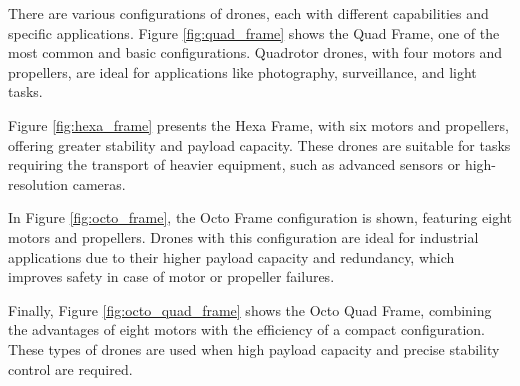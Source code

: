     There are various configurations of drones, each with different capabilities and specific applications. Figure \ref{fig:quad_frame} shows the Quad Frame, one of the most common and basic configurations. Quadrotor drones, with four motors and propellers, are ideal for applications like photography, surveillance, and light tasks.

    Figure \ref{fig:hexa_frame} presents the Hexa Frame, with six motors and propellers, offering greater stability and payload capacity. These drones are suitable for tasks requiring the transport of heavier equipment, such as advanced sensors or high-resolution cameras.

    In Figure \ref{fig:octo_frame}, the Octo Frame configuration is shown, featuring eight motors and propellers. Drones with this configuration are ideal for industrial applications due to their higher payload capacity and redundancy, which improves safety in case of motor or propeller failures.

    Finally, Figure \ref{fig:octo_quad_frame} shows the Octo Quad Frame, combining the advantages of eight motors with the efficiency of a compact configuration. These types of drones are used when high payload capacity and precise stability control are required.

